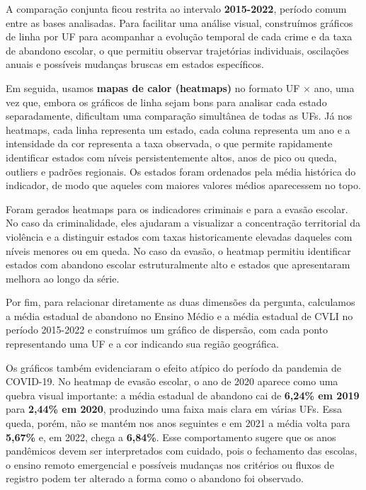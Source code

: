 \documentclass[10pt]{article}
\begin{document}
A comparação conjunta ficou restrita ao intervalo \textbf{2015-2022}, período comum entre as bases analisadas. Para facilitar uma análise visual, construímos gráficos de linha por UF para acompanhar a evolução temporal de cada crime e da taxa de abandono escolar, o que permitiu observar trajetórias individuais, oscilações anuais e possíveis mudanças bruscas em estados específicos.

Em seguida, usamos \textbf{mapas de calor (heatmaps)} no formato UF $\times$ ano, uma vez que, embora os gráficos de linha sejam bons para analisar cada estado separadamente, dificultam uma comparação simultânea de todas as UFs. Já nos heatmaps, cada linha representa um estado, cada coluna representa um ano e a intensidade da cor representa a taxa observada, o que permite rapidamente identificar estados com níveis persistentemente altos, anos de pico ou queda, outliers e padrões regionais. Os estados foram ordenados pela média histórica do indicador, de modo que aqueles com maiores valores médios aparecessem no topo.

Foram gerados heatmaps para os indicadores criminais e para a evasão escolar. No caso da criminalidade, eles ajudaram a visualizar a concentração territorial da violência e a distinguir estados com taxas historicamente elevadas daqueles com níveis menores ou em queda. No caso da evasão, o heatmap permitiu identificar estados com abandono escolar estruturalmente alto e estados que apresentaram melhora ao longo da série.

Por fim, para relacionar diretamente as duas dimensões da pergunta, calculamos a média estadual de abandono no Ensino Médio e a média estadual de CVLI no período 2015-2022 e construímos um gráfico de dispersão, com cada ponto representando uma UF e a cor indicando sua região geográfica.

Os gráficos também evidenciaram o efeito atípico do período da pandemia de COVID-19. No heatmap de evasão escolar, o ano de 2020 aparece como uma quebra visual importante: a média estadual de abandono cai de \textbf{6,24\% em 2019} para \textbf{2,44\% em 2020}, produzindo uma faixa mais clara em várias UFs. Essa queda, porém, não se mantém nos anos seguintes e em 2021 a média volta para \textbf{5,67\%} e, em 2022, chega a \textbf{6,84\%}. Esse comportamento sugere que os anos pandêmicos devem ser interpretados com cuidado, pois o fechamento das escolas, o ensino remoto emergencial e possíveis mudanças nos critérios ou fluxos de registro podem ter alterado a forma como o abandono foi observado.
\end{document}
